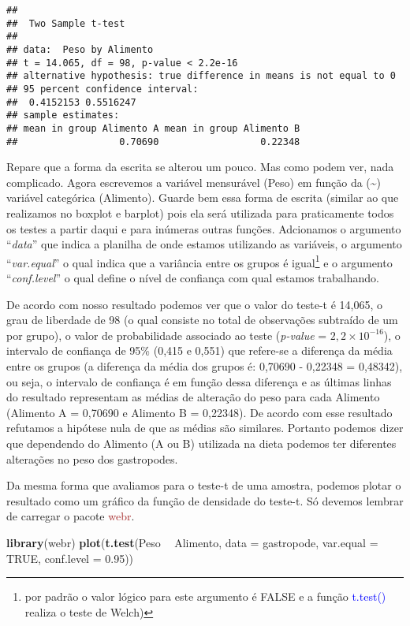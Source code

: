 \documentclass[14pt,titlepage, oneside, openany, a4paper]{book}
\newenvironment{Shaded}{\begin{snugshade}}{\end{snugshade}}
\newcommand{\DataTypeTok}[1]{\textcolor[rgb]{0.13,0.29,0.53}{#1}}
\newcommand{\FloatTok}[1]{\textcolor[rgb]{0.00,0.00,0.81}{#1}}
\newcommand{\KeywordTok}[1]{\textcolor[rgb]{0.13,0.29,0.53}{\textbf{#1}}}
\newcommand{\NormalTok}[1]{#1}
\newcommand{\OperatorTok}[1]{\textcolor[rgb]{0.81,0.36,0.00}{\textbf{#1}}}
\newcommand{\OtherTok}[1]{\textcolor[rgb]{0.56,0.35,0.01}{#1}}
\newcommand{\StringTok}[1]{\textcolor[rgb]{0.31,0.60,0.02}{#1}}
\begin{document}
\begin{verbatim}
## 
##  Two Sample t-test
## 
## data:  Peso by Alimento
## t = 14.065, df = 98, p-value < 2.2e-16
## alternative hypothesis: true difference in means is not equal to 0
## 95 percent confidence interval:
##  0.4152153 0.5516247
## sample estimates:
## mean in group Alimento A mean in group Alimento B 
##                  0.70690                  0.22348
\end{verbatim}

Repare que a forma da escrita se alterou um pouco. Mas como podem ver, nada complicado. Agora escrevemos a variável mensurável (Peso) em função da (\textasciitilde{}) variável categórica (Alimento). Guarde bem essa forma de escrita (similar ao que realizamos no boxplot e barplot) pois ela será utilizada para praticamente todos os testes a partir daqui e para inúmeras outras funções. Adcionamos o argumento ``\emph{data}'' que indica a planilha de onde estamos utilizando as variáveis, o argumento ``\emph{var.equal}'' o qual indica que a variância entre os grupos é igual\footnote{por padrão o valor lógico para este argumento é FALSE e a função \textcolor{blue}{t.test()} realiza o teste de Welch)} e o argumento ``\emph{conf.level}'' o qual define o nível de confiança com qual estamos trabalhando.

De acordo com nosso resultado podemos ver que o valor do teste-t é 14,065, o grau de liberdade de 98 (o qual consiste no total de observações subtraído de um por grupo), o valor de probabilidade associado ao teste (\emph{p-value} = \(2,2\times10^{-16}\)), o intervalo de confiança de 95\% (0,415 e 0,551) que refere-se a diferença da média entre os grupos (a diferença da média dos grupos é: 0,70690 - 0,22348 = 0,48342), ou seja, o intervalo de confiança é em função dessa diferença e as últimas linhas do resultado representam as médias de alteração do peso para cada Alimento (Alimento A = 0,70690 e Alimento B = 0,22348). De acordo com esse resultado refutamos a hipótese nula de que as médias são similares. Portanto podemos dizer que dependendo do Alimento (A ou B) utilizada na dieta podemos ter diferentes alterações no peso dos gastropodes.

Da mesma forma que avaliamos para o teste-t de uma amostra, podemos plotar o resultado como um gráfico da função de densidade do teste-t. Só devemos lembrar de carregar o pacote \textcolor{brown}{webr}.

\begin{Shaded}
\begin{Highlighting}[]
\KeywordTok{library}\NormalTok{(webr)}
\KeywordTok{plot}\NormalTok{(}\KeywordTok{t.test}\NormalTok{(Peso }\OperatorTok{~}\StringTok{ }\NormalTok{Alimento, }
            \DataTypeTok{data =}\NormalTok{ gastropode,}
            \DataTypeTok{var.equal =} \OtherTok{TRUE}\NormalTok{,}
            \DataTypeTok{conf.level =} \FloatTok{0.95}\NormalTok{))}
\end{Highlighting}
\end{Shaded}
\end{document}
